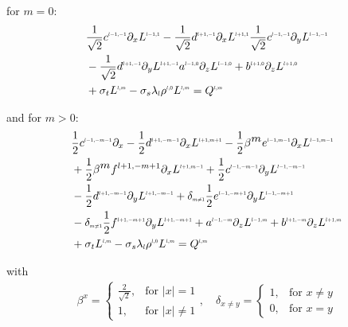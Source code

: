 for $m=0$:
\begin{align}
&
\frac{1}{\sqrt{2}}c^{\scaleto{l-1,-1}{4pt}}\partial_x L^{\scaleto{l-1,1}{4pt}}
-\frac{1}{\sqrt{2}}d^{\scaleto{l+1,-1}{4pt}}\partial_x L^{\scaleto{l+1,1}{4pt}}
\frac{1}{\sqrt{2}}c^{\scaleto{l-1,-1}{4pt}}\partial_y L^{\scaleto{l-1,-1}{4pt}}
\nonumber
\\&
-\frac{1}{\sqrt{2}}d^{\scaleto{l+1,-1}{4pt}}\partial_y L^{\scaleto{l+1,-1}{4pt}}
a^{\scaleto{l-1,0}{4pt}}\partial_z L^{\scaleto{l-1,0}{4pt}}
+b^{\scaleto{l+1,0}{4pt}}\partial_z L^{\scaleto{l+1,0}{4pt}}
\nonumber
\\&
+\sigma_t L^{\scaleto{l,m}{4pt}}
-\sigma_s\lambda_{\scaleto{l}{4pt}}\phase^{\scaleto{l,0}{4pt}}L^{\scaleto{l,m}{4pt}}
= Q^{\scaleto{l,m}{4pt}}
\end{align}


and for $m>0$:
\begin{align}
&
\frac{1}{2}c^{\scaleto{l-1,-m-1}{4pt}}\partial_x 
-\frac{1}{2}d^{\scaleto{l+1,-m-1}{4pt}}\partial_x L^{\scaleto{l+1,m+1}{4pt}}
-\frac{1}{2}\beta^{\scaleto{m}{4pt}}e^{\scaleto{l-1,m-1}{4pt}}\partial_x L^{\scaleto{l-1,m-1}{4pt}}
\nonumber
\\&
+\frac{1}{2}\beta^{\scaleto{m}{4pt}}f^{l+1,-m+1}\partial_x L^{\scaleto{l+1,m-1}{4pt}}
+\frac{1}{2}c^{\scaleto{l-1,-m-1}{4pt}}\partial_y L^{\scaleto{l-1,-m-1}{4pt}}
\nonumber
\\&
-\frac{1}{2}d^{\scaleto{l+1,-m-1}{4pt}}\partial_y L^{\scaleto{l+1,-m-1}{4pt}}
+\delta_{\scaleto{m\neq 1}{4pt}}\frac{1}{2}e^{\scaleto{l-1,-m+1}{4pt}}\partial_y L^{\scaleto{l-1,-m+1}{4pt}}
\nonumber
\\&
-\delta_{\scaleto{m\neq 1}{4pt}}\frac{1}{2}f^{\scaleto{l+1,-m+1}{4pt}}\partial_y L^{\scaleto{l+1,-m+1}{4pt}}
+a^{\scaleto{l-1,-m}{4pt}}\partial_z L^{\scaleto{l-1,m}{4pt}}
+b^{\scaleto{l+1,-m}{4pt}}\partial_z L^{\scaleto{l+1,m}{4pt}}
\nonumber
\\&
+\sigma_t L^{\scaleto{l,m}{4pt}}
-\sigma_s\lambda_{\scaleto{l}{4pt}}\phase^{\scaleto{l,0}{4pt}}L^{\scaleto{l,m}{4pt}}
= Q^{\scaleto{l,m}{4pt}}
\end{align}



with
\begin{align*}
\beta^{x}=
\left\{
\begin{array}{ll}
\frac{2}{\sqrt{2}}, & \text{for } \vert x\vert = 1\\
1, & \text{for } \vert x\vert \neq 1
\end{array}
\right.
,\quad
\delta_{x\neq y}=
\left\{
\begin{array}{ll}
1, & \text{for } x \neq y\\
0, & \text{for } x = y
\end{array}
\right.
\end{align*}


